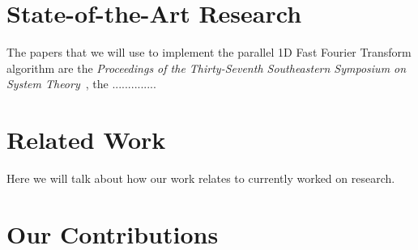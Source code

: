 \documentclass[journal]{IEEEtran}
\begin{document}
\section{State-of-the-Art Research}

	\par The papers that we will use to implement the parallel 1D Fast Fourier Transform algorithm are the \textit{Proceedings of the Thirty-Seventh Southeastern Symposium on System Theory}~\cite{Al}, the ..............

\section{Related Work}
Here we will talk about how our work relates to currently worked on research.

\section{Our Contributions}



\medskip


\end{document}
